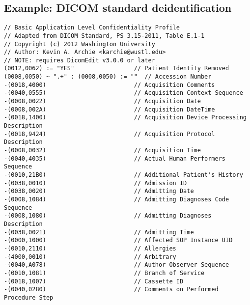 \documentclass{beamer}  %
\begin{document}
\subsection{Example: DICOM standard deidentification}
\begin{frame}[fragile]
\tiny
\begin{verbatim}
// Basic Application Level Confidentiality Profile
// Adapted from DICOM Standard, PS 3.15-2011, Table E.1-1
// Copyright (c) 2012 Washington University
// Author: Kevin A. Archie <karchie@wustl.edu>
// NOTE: requires DicomEdit v3.0.0 or later
(0012,0062) := "YES"                 // Patient Identity Removed
(0008,0050) ~ ".+" : (0008,0050) := ""  // Accession Number
-(0018,4000)                         // Acquisition Comments
-(0040,0555)                         // Acquisition Context Sequence
-(0008,0022)                         // Acquisition Date
-(0008,002A)                         // Acquisition DateTime
-(0018,1400)                         // Acquisition Device Processing Description
-(0018,9424)                         // Acquisition Protocol Description
-(0008,0032)                         // Acquisition Time
-(0040,4035)                         // Actual Human Performers Sequence
-(0010,21B0)                         // Additional Patient's History
-(0038,0010)                         // Admission ID
-(0038,0020)                         // Admitting Date
-(0008,1084)                         // Admitting Diagnoses Code Sequence
-(0008,1080)                         // Admitting Diagnoses Description
-(0038,0021)                         // Admitting Time
-(0000,1000)                         // Affected SOP Instance UID
-(0010,2110)                         // Allergies
-(4000,0010)                         // Arbitrary
-(0040,A078)                         // Author Observer Sequence
-(0010,1081)                         // Branch of Service
-(0018,1007)                         // Cassette ID
-(0040,0280)                         // Comments on Performed Procedure Step
\end{verbatim}
\end{frame}
\end{document}
